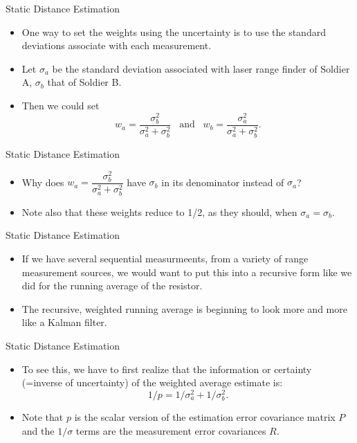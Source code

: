\begin{frame}
Static Distance Estimation
\begin{itemize}
  \item One way to set the weights using the uncertainty is to use the standard deviations associate with each measurement.
  \item Let $\sigma_a$ be the standard deviation associated with laser range finder of Soldier A, $\sigma_b$ that of Soldier B.
  \item Then we could set 
\[w_a=\dfrac{\sigma_b^2}{\sigma_a^2+\sigma_b^2}\;\;\;\text{and}\;\;\;
  w_b=\dfrac{\sigma_a^2}{\sigma_a^2+\sigma_b^2}.
\]
\end{itemize} 
\end{frame}

\begin{frame}
Static Distance Estimation
\begin{itemize}
  \item Why does $w_a=\dfrac{\sigma_b^2}{\sigma_a^2+\sigma_b^2}$ have $\sigma_b$ in its denominator instead of $\sigma_a$?
  \item Note also that these weights reduce to 1/2, as they should, when $\sigma_a=\sigma_b$.
\end{itemize} 
\end{frame}


\begin{frame}
Static Distance Estimation
\begin{itemize}
  \item If we have several sequential measurmeents, from a variety of range measurement sources, we would want to put this into a recursive form
like we did for the running average of the resistor.
  \item The recursive, weighted running average is beginning to look more and more like a Kalman filter.
\end{itemize} 
\end{frame}

\begin{frame}
Static Distance Estimation
\begin{itemize}
  \item To see this, we have to first realize that the information or certainty (=inverse of uncertainty) 
of the weighted average estimate is:
\[1/p=1/\sigma_a^2 + 1/\sigma_b^2.\]
 \item Note that $p$ is the scalar version of the estimation error covariance matrix $P$ and the $1/\sigma$ terms
are the measurement error covariances $R$.
\end{itemize} 
\end{frame}



